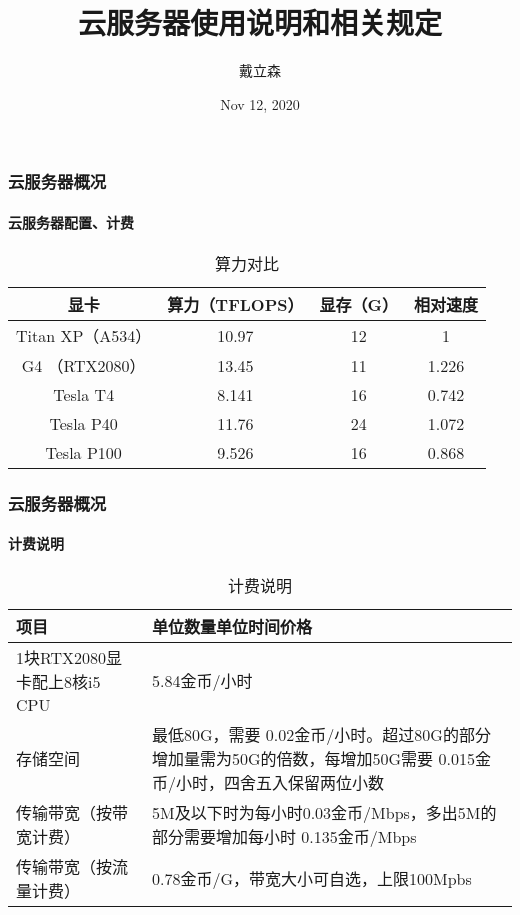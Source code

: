 \documentclass[10pt]{beamer}
\title{
    {云服务器使用说明和相关规定}
}
\author{戴立森}
\date{Nov 12, 2020}
\begin{document}
    \maketitle
    \begin{frame}
        \frametitle{云服务器概况}
            \framesubtitle{云服务器配置、计费}

            {\small
            \begin{table}[h]
                \centering
                \caption{算力对比}\label{tab:tab1}
                    \begin{tabular}{|c|c|c|c|}
                        \hline
                        显卡 & 算力（TFLOPS） & 显存（G） & 相对速度 \\
                        \hline
                        Titan XP（A534） & 10.97 & 12 & 1 \\
                        \hline
                        G4 （RTX2080） & 13.45 & 11 & 1.226 \\
                        \hline
                        Tesla T4 & 8.141 & 16 & 0.742 \\
                        \hline
                        Tesla P40 & 11.76 & 24 & 1.072 \\
                        \hline
                        Tesla P100 & 9.526 & 16 & 0.868 \\
                        \hline
                    \end{tabular}
            \end{table}
            }

    \end{frame}


    \begin{frame}
        \frametitle{云服务器概况}
            \framesubtitle{计费说明}

            {\small
            \begin{table}[h]
                \centering
                \caption{计费说明}\label{tab:tab1}
                    \begin{tabular}{|p{}|p{}|}
                        \hline
                        项目 & 单位数量单位时间价格 \\
                        \hline
                        1块RTX2080显卡配上8核i5 CPU & 5.84金币/小时 \\
                        \hline
                        存储空间 & 最低80G，需要 0.02金币/小时。超过80G的部分增加量需为50G的倍数，每增加50G需要 0.015金币/小时，四舍五入保留两位小数 \\
                        \hline
                        传输带宽（按带宽计费） & 5M及以下时为每小时0.03金币/Mbps，多出5M的部分需要增加每小时 0.135金币/Mbps \\
                        \hline
                        传输带宽（按流量计费） & 0.78金币/G，带宽大小可自选，上限100Mpbs \\
                        \hline
                    \end{tabular}
            \end{table}
            }

    \end{frame}
\end{document}
